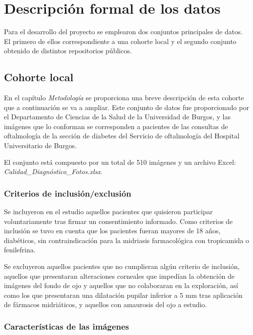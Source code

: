 
\section{Descripción formal de los datos}

Para el desarrollo del proyecto se emplearon dos conjuntos principales de datos. El primero de ellos correspondiente a una cohorte local y el segundo conjunto obtenido de distintos repositorios públicos.

\subsection{Cohorte local}

En el capítulo \textit{Metodología} se proporciona una breve descripción de esta cohorte que a continuación se va a ampliar. Este conjunto de datos fue proporcionado por el Departamento de Ciencias de la Salud de la Universidad de Burgos, y las imágenes que lo conforman se corresponden a pacientes de las consultas de oftalmología de la sección de diabetes del Servicio de oftalmología del Hospital Universitario de Burgos.

El conjunto está compuesto por un total de 510 imágenes y un archivo Excel: \textit{Calidad\_Diagnóstico\_Fotos.xlsx}.

\subsubsection{Criterios de inclusión/exclusión}

Se incluyeron en el estudio aquellos pacientes que quisieron participar voluntariamente tras firmar un consentimiento informado. Como criterios de inclusión se tuvo en cuenta que los pacientes fueran mayores de 18 años, diabéticos, sin contraindicación para la midriasis farmacológica con tropicamida o fenilefrina. 

Se excluyeron aquellos pacientes que no cumplieran algún criterio de inclusión, aquellos que presentaran alteraciones corneales que impedían la obtención de imágenes del fondo de ojo y aquellos que no colaboraran en la exploración, así como los que presentaran una dilatación pupilar inferior a 5 mm tras aplicación de fármacos midriáticos, y aquellos con amaurosis del ojo a estudio.

\subsubsection{Características de las imágenes}

